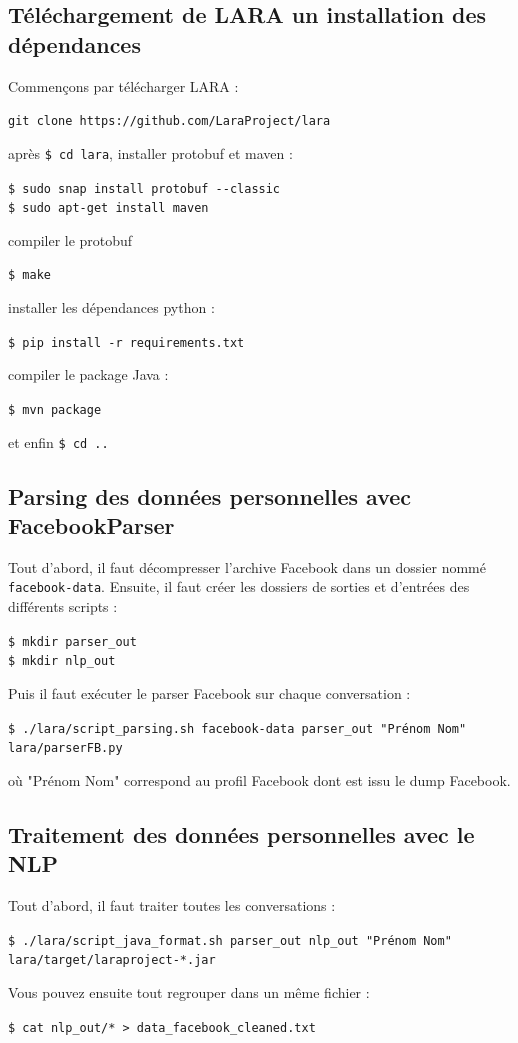 \documentclass[10pt,a4paper]{article}
\begin{document}
\subsection{Téléchargement de LARA un installation des dépendances}
Commençons par télécharger LARA :
\begin{center}
	\texttt{git clone https://github.com/LaraProject/lara}
\end{center}
après \texttt{\$ cd lara}, installer protobuf et maven :
\begin{center}
	\texttt{\$ sudo snap install protobuf -{}-classic} \\
	\texttt{\$ sudo apt-get install maven}
\end{center}
compiler le protobuf
\begin{center}
    \texttt{\$ make}
\end{center}
installer les dépendances python :
\begin{center}
	\texttt{\$ pip install -r requirements.txt}
\end{center}
compiler le package Java :
\begin{center}
	\texttt{\$ mvn package}
\end{center}
et enfin \texttt{\$ cd ..}

\subsection{Parsing des données personnelles avec FacebookParser}
Tout d'abord, il faut décompresser l'archive Facebook dans un dossier nommé \texttt{facebook-data}. Ensuite, il faut créer les dossiers de sorties et d'entrées des différents scripts :
\begin{center}
	\texttt{\$ mkdir parser\_out} \\
	\texttt{\$ mkdir nlp\_out}
\end{center}
Puis il faut exécuter le parser Facebook sur chaque conversation :
\begin{center}
	\texttt{\$ ./lara/script\_parsing.sh facebook-data parser\_out "Prénom Nom" lara/parserFB.py}
\end{center}
où "Prénom Nom" correspond au profil Facebook dont est issu le dump Facebook.

\subsection{Traitement des données personnelles avec le NLP}
Tout d'abord, il faut traiter toutes les conversations :
\begin{center}
	\texttt{\$ ./lara/script\_java\_format.sh parser\_out nlp\_out "Prénom Nom" lara/target/laraproject-*.jar}
\end{center}
Vous pouvez ensuite tout regrouper dans un même fichier :
\begin{center}
	\texttt{\$ cat nlp\_out/* > data\_facebook\_cleaned.txt}
\end{center}
\end{document}
